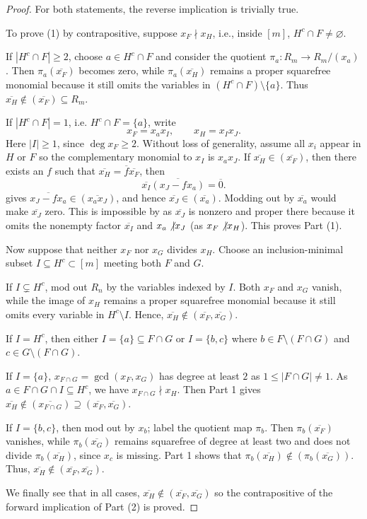 \begin{proof}
For both statements, the reverse implication is trivially true.

To prove (1) by contrapositive, suppose \(x_F\nmid x_H\), i.e., inside $[m]$, $H^c \cap F\neq \varnothing$.


If \(|H^c \cap F|\geq 2\), choose \(a\in H^c \cap F\) and consider the quotient \(\pi_a: R_m \to R_m/(x_a)\).  
Then \(\pi_a(\overline{x_F})\) becomes zero, while \(\pi_a(\overline{x_H})\) remains a proper squarefree monomial because it still omits
the variables in \((H^c \cap F)\setminus\{a\}\). 
Thus \(\overline{x_H}\not\in(\overline{x_F})\subseteq R_m\).

If \(|H^c \cap F|=1\), i.e. $H^c\cap F = \{a\}$, write
\[ x_F=x_ax_I,\qquad x_H=x_Ix_J.\]
Here \(|I|\geq 1\), since \(\deg x_F\geq2\).
Without loss of generality, assume all $x_i$ appear in $H$ or $F$ so the complementary monomial to \(x_I\) is \(x_ax_J\). 
If \(\overline{x_H}\in (\overline{x_F})\), then there exists an $f$ such that \(\overline{x_H} = \overline{f}\overline{x_F}\), then
\[  \overline{x_I}\overline{(x_J-fx_a)}=\overline{0}. \]
 gives \(\overline{x_J-fx_a}\in(\overline{x_ax_J})\), and hence \(\overline{x_J}\in(\overline{x_a})\). 
Modding out by \(\overline{x_a}\) would make \(\overline{x_J}\) zero.  
This is impossible by  as \(\overline{x_J}\) is nonzero and proper there because it omits the nonempty factor \(\overline{x_I}\) and $x_a\not\vert x_J$ (as $x_F\not\vert x_H$).  
This proves Part (1).

Now suppose that neither \(x_F\) nor \(x_G\) divides \(x_H\).  
Choose an inclusion-minimal subset \(I\subseteq H^c\subset [m]\) meeting both \(F\) and \(G\).

If \(I\subsetneq H^c\), mod out $R_n$ by the variables indexed by \(I\).  
Both \(x_F\) and \(x_G\) vanish, while the image of \(x_H\) remains a proper squarefree monomial because it still omits every variable in \(H^c\setminus I\).  
Hence, \(\overline{x_H}\notin(\overline{x_F},\overline{x_G})\).


If \(I= H^c\), then either $I = \{a\} \subseteq F\cap G$ or $I = \{b,c\}$ where  $b\in F\setminus (F\cap G)$ and $c\in G\setminus (F\cap G)$.  
 
If $I= \{a\}$, $x_{F\cap G}=\gcd(x_F,x_G)$ has degree at least $2$ as $1\leq |F\cap G| \neq 1$.  
As $a\in F\cap G \cap I \subseteq H^c$, we have \(x_{F\cap G}\nmid x_H\).
Then Part 1 gives \(\overline{x_H}\notin (\overline{x_{F\cap G}})\supseteq(\overline{x_F},\overline{x_G})\).

If $I = \{b,c\}$, then mod out by $x_b$; label the quotient map $\pi_b$.
Then \(\pi_b(\overline{x_F})\) vanishes, while  \(\pi_b(\overline{x_G})\) remains squarefree of degree at least two and does not divide \(\pi_b(\overline{x_H})\), since \(x_c\) is missing.  
Part 1 shows that \(\pi_b(\overline{x_H})\not\in(\pi_b(\overline{x_G}))\).
Thus, \(\overline{x_H}\notin(\overline{x_F},\overline{x_G})\).

We finally see that in all cases,  \(\overline{x_H}\notin(\overline{x_F},\overline{x_G})\) so the contrapositive of the forward implication of Part (2) is proved.
\end{proof}



